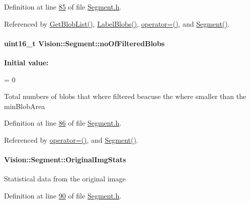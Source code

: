 Definition at line \hyperlink{_segment_8h_source_l00085}{85} of file \hyperlink{_segment_8h_source}{Segment.\+h}.



Referenced by \hyperlink{_segment_8cpp_source_l00534}{Get\+Blob\+List()}, \hyperlink{_segment_8cpp_source_l00316}{Label\+Blobs()}, \hyperlink{_segment_8cpp_source_l00041}{operator=()}, and \hyperlink{_segment_8cpp_source_l00026}{Segment()}.

\hypertarget{class_vision_1_1_segment_a97077da3a144e800073bc06f5d4722d4}{}
\paragraph[{no\+Of\+Filtered\+Blobs}]{\setlength{\rightskip}{0pt plus 5cm}uint16\+\_\+t Vision\+::\+Segment\+::no\+Of\+Filtered\+Blobs}\label{class_vision_1_1_segment_a97077da3a144e800073bc06f5d4722d4}
{\bfseries Initial value\+:}
\begin{DoxyCode}
=
      0
\end{DoxyCode}
Total numbers of blobs that where filtered beacuse the where smaller than the min\+Blob\+Area 

Definition at line \hyperlink{_segment_8h_source_l00086}{86} of file \hyperlink{_segment_8h_source}{Segment.\+h}.



Referenced by \hyperlink{_segment_8cpp_source_l00041}{operator=()}, and \hyperlink{_segment_8cpp_source_l00026}{Segment()}.

\hypertarget{class_vision_1_1_segment_ab35cfe5504de7e5ea327991468e6cf3b}{}
\paragraph[{Original\+Img\+Stats}]{ Vision\+::\+Segment\+::\+Original\+Img\+Stats}\label{class_vision_1_1_segment_ab35cfe5504de7e5ea327991468e6cf3b}
Statistical data from the original image 

Definition at line \hyperlink{_segment_8h_source_l00090}{90} of file \hyperlink{_segment_8h_source}{Segment.\+h}.



